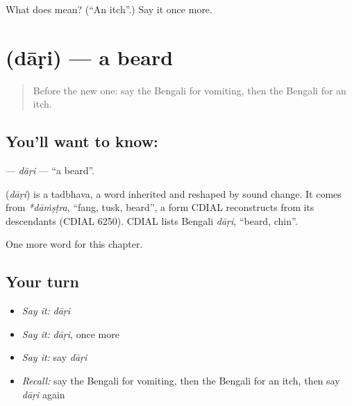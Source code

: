 \begin{tcolorbox}[breakable,colback=teal!4,colframe=teal!35!black,title={Before you move on}]
What does  mean? (\textquotedblleft{}An itch\textquotedblright{}.) Say it once more.
\end{tcolorbox}
\section[\texorpdfstring{\bn{দাড়ি} (dāṛi)}{দাড়ি (dāṛi)}]{ (dāṛi) — a beard}

\label{lesson:BN-C243-dari}



\begin{quote}
Before the new one: say the Bengali for vomiting, then the Bengali for an itch.
\end{quote}

\subsection*{You'll want to know: }
\textbf{} — \emph{dāṛi} — \textquotedblleft{}a beard\textquotedblright{}.

\begin{cousinweb}
\textbf{} (\emph{dāṛi}) is a tadbhava, a word inherited and reshaped by sound change. It comes from \emph{*dāṁṣṭra}, \textquotedblleft{}fang, tusk, beard\textquotedblright{}, a form CDIAL reconstructs from its descendants (CDIAL 6250). CDIAL lists Bengali \emph{dāṛi}, \textquotedblleft{}beard, chin\textquotedblright{}.
\end{cousinweb}

\begin{grammarlens}[title={What you've built}]
One more word for this chapter.
\end{grammarlens}

\subsection*{Your turn}
\begin{itemize}
\raggedright
  \item \emph{Say it:} \emph{dāṛi}
  \item \emph{Say it:} \emph{dāṛi}, once more
  \item \emph{Say it:} say \emph{dāṛi}
  \item \emph{Recall:} say the Bengali for vomiting, then the Bengali for an itch, then say \emph{dāṛi} again
\end{itemize}

